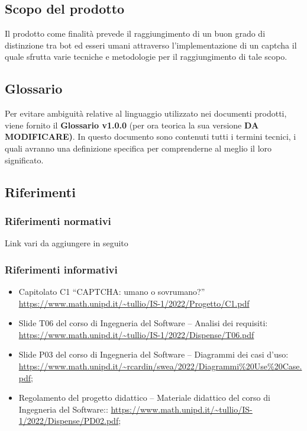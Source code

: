 \subsection{Scopo del prodotto}
Il prodotto come finalità prevede il raggiungimento di un buon grado di distinzione tra bot ed esseri umani attraverso l'implementazione di un captcha il quale sfrutta varie tecniche e metodologie per il raggiungimento di tale scopo.

\subsection{Glossario}
Per evitare ambiguità relative al linguaggio utilizzato nei documenti prodotti, viene fornito il \textbf{Glossario v1.0.0} (per ora teorica la sua versione \textbf{DA MODIFICARE)}. In questo documento sono contenuti tutti i termini tecnici, i quali avranno una definizione specifica per comprenderne al meglio il loro significato.

\subsection{Riferimenti}

\subsubsection{Riferimenti normativi}
Link vari da aggiungere in seguito

\subsubsection{Riferimenti informativi}

\begin{itemize}:
	\item Capitolato C1 “CAPTCHA: umano o sovrumano?”
	\url{https://www.math.unipd.it/~tullio/IS-1/2022/Progetto/C1.pdf}
	\item Slide T06 del corso di Ingegneria del Software – Analisi dei requisiti:
	\url{https://www.math.unipd.it/~tullio/IS-1/2022/Dispense/T06.pdf}
	\item Slide P03 del corso di Ingegneria del Software – Diagrammi dei casi d'uso:
	\url{https://www.math.unipd.it/~rcardin/swea/2022/Diagrammi%20Use%20Case.pdf};
	\item Regolamento del progetto didattico – Materiale didattico del corso di Ingegneria del Software::
	\url{https://www.math.unipd.it/~tullio/IS-1/2022/Dispense/PD02.pdf};
\end{itemize}
